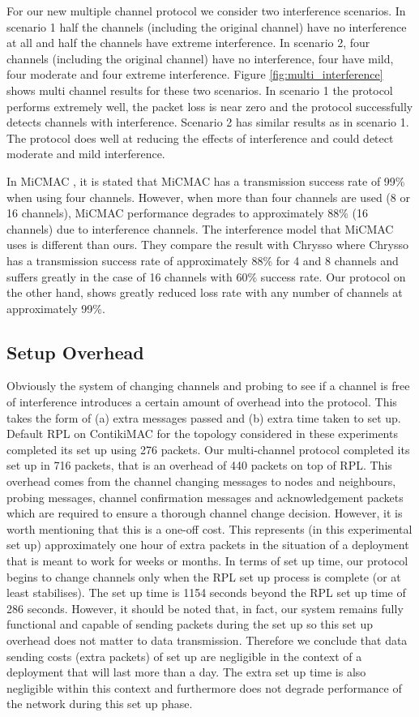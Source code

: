 For our new multiple channel protocol we consider two interference scenarios.
In scenario 1 half the channels (including the original channel) have no
interference at all and half the channels have extreme interference.
In scenario 2, four channels (including the original channel) have no
interference, four have mild, four moderate and four extreme interference.
Figure \ref{fig:multi_interference} shows multi channel results for these
two scenarios.  In scenario 1 the protocol performs extremely well, the packet loss is near zero and the protocol successfully detects channels with interference.
Scenario 2 has similar results as in scenario 1. The protocol does well at reducing the effects of interference and could detect moderate and mild interference.

In MiCMAC \cite{micmac}, it is stated that MiCMAC has a transmission success rate of 99\% when using four channels. However, when more than four channels are used (8 or 16 channels), MiCMAC performance degrades to approximately 88\% (16 channels) due to interference channels. The interference model that MiCMAC uses is different than ours. They compare the result with Chrysso where Chrysso has a transmission success rate of approximately 88\% for 4 and 8 channels and suffers greatly in the case of 16 channels with 60\% success rate.
Our protocol on the other hand, shows greatly reduced loss rate with any number of channels at approximately 99\%.

\subsection{Setup Overhead}
Obviously the system of changing channels and probing to see if a channel is free of interference introduces a certain amount of overhead into
the protocol. This takes the form of (a) extra messages passed and (b) extra time taken to set up. Default RPL on ContikiMAC for the topology considered in these experiments completed its set up using 276 packets. Our multi-channel protocol completed its set up in 716 packets, that is an overhead of 440 packets on top of RPL. 
This overhead comes from the channel changing messages to nodes and neighbours, probing messages, channel confirmation messages and acknowledgement packets which are required to ensure a thorough channel change decision.
However, it is worth mentioning that this is a one-off cost. This represents (in this experimental set up) approximately one hour of extra packets in the situation of a deployment that is meant to work for weeks or months.  In terms of set up time, our protocol begins to change channels only when the RPL set up process is complete (or at least stabilises). The set up time is 1154 seconds beyond the RPL set up time of 286 seconds. However, it should be noted that, in fact, our system remains fully functional and capable of sending packets during the set up so this set up overhead does not matter to data transmission.
Therefore we conclude that data sending costs (extra packets) of set up are negligible in the context of a deployment that will last more than a day. The extra set up time is also negligible within this context and furthermore does not degrade performance of the network during this set up phase.